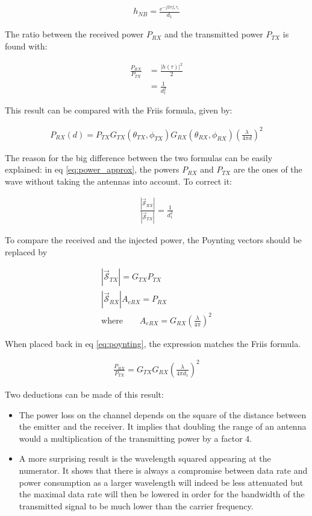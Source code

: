 \documentclass[10pt,a4paper]{ULBreport}
\begin{document}
\begin{align*}
    h_{NB} = \frac{e^{-j2\pi f_c \tau_1}}{d_1}
\end{align*}

The ratio between the received power $P_{RX}$ and the transmitted power $P_{TX}$ is found with:

\begin{align}
    \frac{P_{RX}}{P_{TX}} &= \frac{\left| h(\tau) \right|^2}{2} \nonumber\\
    &= \frac{1}{d_1^2}
    \label{eq:power_approx}
\end{align}

This result can be compared with the Friis formula, given by:

\begin{align}
    P_{RX}(d) = P_{TX} G_{TX}(\theta_{TX}, \phi_{TX})G_{RX}(\theta_{RX}, \phi_{RX})\left(\frac{\lambda}{4\pi d}\right)^2
    \label{eq:friis_formula}
\end{align}

The reason for the big difference between the two formulas can be easily explained: in eq \ref{eq:power_approx}, the powers $P_{RX}$ and $P_{TX}$ are the ones of the wave without taking the antennas into account. To correct it:

\begin{align}
    \frac{\left|\bm{\vec{\mathscr{S}}}_{RX}\right|}{\left|\bm{\vec{\mathscr{S}}}_{TX}\right|} = \frac{1}{d_1^2}
    \label{eq:poynting}
\end{align}

To compare the received and the injected power, the Poynting vectors should be replaced by

\begin{align*}
    \left|\bm{\vec{\mathscr{S}}}_{TX}\right| = G_{TX} P_{TX}\\
    \left|\bm{\vec{\mathscr{S}}}_{RX}\right| A_{eRX} = P_{RX}\\
    \text{where} \quad \quad A_{eRX} = G_{RX}\left(\frac{\lambda}{4\pi}\right)^2
\end{align*}

When placed back in eq \ref{eq:poynting}, the expression matches the Friis formula.

\begin{align}
    \frac{P_{RX}}{P_{TX}} = G_{TX} G_{RX} \left(\frac{\lambda}{4\pi d_1}\right)^2
\end{align}

Two deductions can be made of this result: 
\begin{itemize}
    \item The power loss on the channel depends on the square of the distance between the emitter and the receiver. It implies that doubling the range of an antenna would a multiplication of the transmitting power by a factor 4.
    \item A more surprising result is the wavelength squared appearing at the numerator. It shows that there is always a compromise between data rate and power consumption as a larger wavelength will indeed be less attenuated but the maximal data rate will then be lowered in order for the bandwidth of the transmitted signal to be much lower than the carrier frequency.
\end{itemize}
\end{document}
